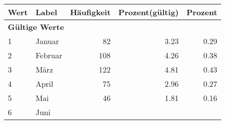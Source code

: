      \begin{longtable}{lXrrr}
     \toprule
     \textbf{Wert} & \textbf{Label} & \textbf{Häufigkeit} & \textbf{Prozent(gültig)} & \textbf{Prozent} \\
     \endhead
     \midrule
     \multicolumn{5}{l}{\textbf{Gültige Werte}}\\

     1 &
     \multicolumn{1}{X}{ Januar   } &


       \num{82} &
       \num[round-mode=places,round-precision=2]{3.23} &
         \num[round-mode=places,round-precision=2]{0.29} \\

     2 &
     \multicolumn{1}{X}{ Februar   } &


       \num{108} &
       \num[round-mode=places,round-precision=2]{4.26} &
         \num[round-mode=places,round-precision=2]{0.38} \\

     3 &
     \multicolumn{1}{X}{ März   } &


       \num{122} &
       \num[round-mode=places,round-precision=2]{4.81} &
         \num[round-mode=places,round-precision=2]{0.43} \\

     4 &
     \multicolumn{1}{X}{ April   } &


       \num{75} &
       \num[round-mode=places,round-precision=2]{2.96} &
         \num[round-mode=places,round-precision=2]{0.27} \\

     5 &
     \multicolumn{1}{X}{ Mai   } &


       \num{46} &
       \num[round-mode=places,round-precision=2]{1.81} &
         \num[round-mode=places,round-precision=2]{0.16} \\

     6 &
     \multicolumn{1}{X}{ Juni   } &



\end{longtable}

